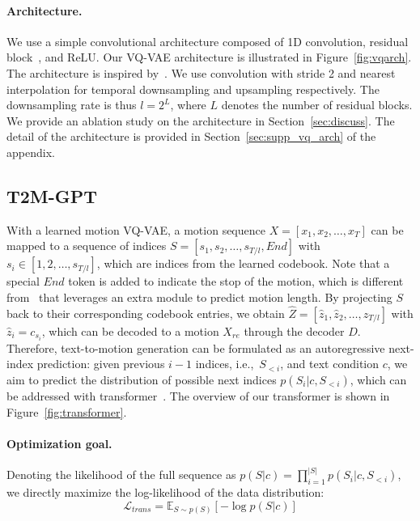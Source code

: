 \documentclass[10pt,twocolumn,letterpaper]{article}
\begin{document}
\paragraph{Architecture.} We use a simple convolutional architecture composed of 1D convolution, residual block~\cite{he2016deep}, and ReLU. Our VQ-VAE architecture is illustrated in Figure~\ref{fig:vqarch}. The architecture is inspired by~\cite{esser2021taming,siyao2022bailando}. We use convolution with stride 2 and nearest interpolation for temporal downsampling and upsampling respectively. The downsampling rate is thus $l = 2^L$, where $L$ denotes the number of residual blocks. We provide an ablation study on the architecture in Section~\ref{sec:discuss}. The detail of the architecture is provided in Section~\ref{sec:supp_vq_arch} of the appendix.

\subsection{T2M-GPT}
\label{sec:transformer}
With a learned motion VQ-VAE, a motion sequence $X = [x_1, x_2, \ldots, x_T ]$ can be mapped to a sequence of indices $S = [s_1, s_2, \ldots, s_{T/l}, \mathit{End}]$ with $s_i \in [1, 2, \ldots, s_{T/l}]$, which are indices from the learned codebook. Note that a special $\mathit{End}$ token is added to indicate the stop of the motion, which is different from~\cite{guo2022generating} that leverages an extra module to predict motion length. By projecting $S$ back to their corresponding codebook entries, we obtain $\hat{Z} = [\hat{z}_1, \hat{z}_2, \ldots, \hat{z}_{T/l}]$ with $\hat{z}_i = c_{s_i}$, which can be decoded to a motion $X_{re}$ through the decoder $D$. Therefore, text-to-motion generation can be formulated as an autoregressive next-index prediction: given previous $i-1$ indices, i.e.,~$S_{< i}$, and text condition $c$, we aim to predict the distribution of possible next indices $p(S_i|c,S_{< i})$, which can be addressed with transformer~\cite{vaswani2017attention}. The overview of our transformer is shown in Figure~\ref{fig:transformer}.

\paragraph{Optimization goal.} Denoting the likelihood of the full sequence as $p(S|c) = \prod^{|S|}_{i=1}p(S_i|c,S_{< i})$, we directly
maximize the log-likelihood of the data distribution:
\begin{equation}
	\mathcal{L}_{trans} = \mathbb{E}_{S\sim p(S)}[-\log p(S|c)]
	\label{formula:5}
\end{equation}
\end{document}
